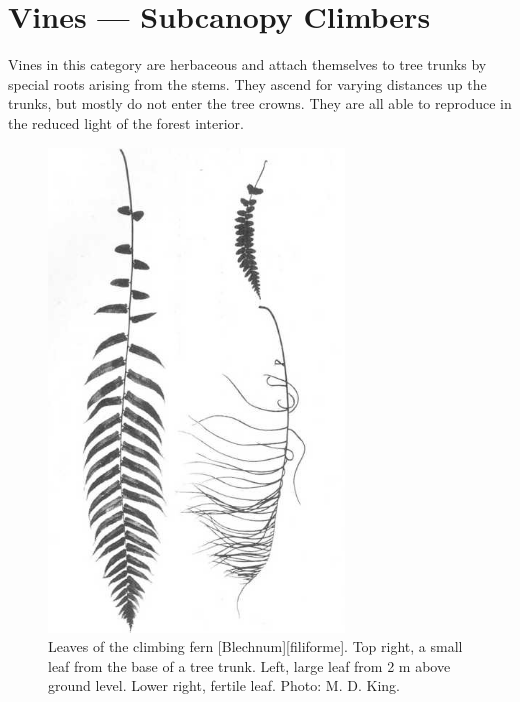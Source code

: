 \section{Vines --- Subcanopy Climbers}

Vines in this category are herbaceous and attach themselves to tree trunks by special roots arising from the stems.
They ascend for varying distances up the trunks, but mostly do not enter the tree crowns.
They are all able to reproduce in the reduced light of the forest interior.

\begin{figure}[htb]
	\centering
	\begin{minipage}[t]{0.486\textwidth}
		\centering
		\includegraphics[width=0.7\textwidth]{graphics/figure27fern.jpg}
    	\caption[Leaves of the climbing fern \emph{Blechnum filiforme}]{Leaves of the climbing fern [Blechnum][filiforme].
    	Top right, a small leaf from the base of a tree trunk.
    	Left, large leaf from 2 m above ground level.
    	Lower right, fertile leaf.
    	Photo: M. D. King.}%
    	\label{fig:27fern}
	\end{minipage}\hfill%
	\begin{minipage}[t]{0.494\textwidth}

\end{minipage}
\end{figure}
